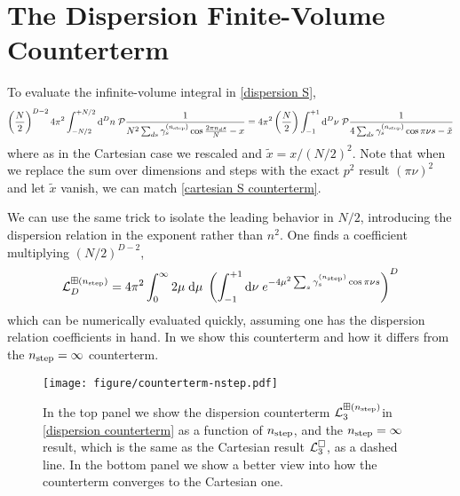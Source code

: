 \section{The Dispersion \Luscher Finite-Volume Counterterm}\label{sec:counterterm/dispersion}

To evaluate the infinite-volume integral in \eqref{dispersion S},
\begin{equation}
    \left(\frac{N}{2}\right)^{D-2}
    4\pi^2 \int_{-N/2}^{+N/2} \mathrm{d}^Dn\; \mathcal{P} \frac{1}{N^2 \sum_{ds} \gamma^{({n_\text{step}})}_s \cos \frac{2\pi n_d s}{N} - x}
    =
    4\pi^2 \left(\frac{N}{2}\right) \int_{-1}^{+1} \mathrm{d}^D\nu\; \mathcal{P} \frac{1}{4\sum_{ds} \gamma^{({n_\text{step}})}_s \cos \pi \nu s - \tilde{x}}
\end{equation}
where as in the Cartesian case we rescaled and $\tilde{x} = x/(N/2)^2$.
Note that when we replace the sum over dimensions and steps with the exact $p^2$ result $(\pi \nu)^2$ and let $\tilde{x}$ vanish, we can match \eqref{cartesian S counterterm}.

We can use the same trick to isolate the leading behavior in $N/2$, introducing the dispersion relation in the exponent rather than $n^2$.
One finds a coefficient multiplying $(N/2)^{D-2}$,
\begin{equation}
    \label{eq:dispersion counterterm}
    \mathcal{L}^{\boxplus ({n_\text{step}})}_D = 4 \pi^2 \int_{0}^{\infty} 2\mu\; \mathrm{d}\mu\; \left(\int_{-1}^{+1} \mathrm{d}\nu\; e^{-4\mu^2 \sum_s \gamma_s^{({n_\text{step}})} \cos \pi \nu s}\right)^D
\end{equation}
which can be numerically evaluated quickly, assuming one has the dispersion relation coefficients in hand.
In  we show this counterterm and how it differs from the ${n_\text{step}}=\infty$ counterterm.

\begin{figure}
    \texttt{[image: figure/counterterm-nstep.pdf]}
    \caption{In the top panel we show the dispersion counterterm $\mathcal{L}^{\boxplus ({n_\text{step}})}_{3}$in \eqref{dispersion counterterm} as a function of ${n_\text{step}}$, and the ${n_\text{step}}=\infty$ result, which is the same as the Cartesian result $\mathcal{L}^{\square}_3$, as a dashed line.  In the bottom panel we show a better view into how the counterterm converges to the Cartesian one.
    }
    \label{fig:nstep counterterm}
\end{figure}
